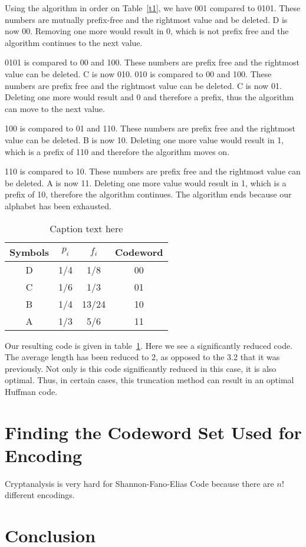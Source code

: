 \documentclass[10pt,letterpaper,notitlepage,draft]{article}
\theoremstyle{definition}
\begin{document}
Using the algorithm in order on Table~\ref{t1}, we have 
001 compared to 0101.  
These numbers are mutually prefix-free and the rightmost value and be deleted.  
D is now 00.  
Removing one more would result in 0, which is not prefix free and the algorithm continues to the next value.

0101 is compared to 00 and 100.
These numbers are prefix free and the rightmost value can be deleted.
C is now 010.
010 is compared to 00 and 100.
These numbers are prefix free and the rightmost value can be deleted.
C is now 01.
Deleting one more would result and 0 and therefore a prefix, thus the algorithm can move to the next value.

100 is compared to 01 and 110.
These numbers are prefix free and the rightmost value can be deleted.
B is now 10.
Deleting one more value would result in 1, which is a prefix of 110 and therefore the algorithm moves on.

110 is compared to 10.
These numbers are prefix free and the rightmost value can be deleted.
A is now 11.
Deleting one more value would result in 1, which is a prefix of 10, therefore the algorithm continues.
The algorithm ends because our alphabet has been exhausted.

\begin{table}[h]
\begin{center}
\begin{tabular}{|c|c|c|c|}
\hline
Symbols & $p_i$ & $f_i$ & Codeword \\
\hline
\hline
D & 1/4 & 1/8 & 00 \\
\hline
C & 1/6 & 1/3 & 01 \\
\hline
B & 1/4 & 13/24 & 10 \\
\hline
A & 1/3 & 5/6 & 11 \\
\hline
\end{tabular}
\end{center}
\caption{Caption text here}\label{t3}
\end{table}

Our resulting code is given in table~\ref{t3}.
Here we see a significantly reduced code.  The average length has been reduced to 2, as opposed to the 3.2 that it was previously.  Not only is this code significantly reduced in this case, it is also optimal.  Thus, in certain cases, this truncation method can result in an optimal Huffman code.


\section{Finding the Codeword Set Used for Encoding}
Cryptanalysis is very hard for Shannon-Fano-Elias Code because there are $n!$ different encodings.



\section{Conclusion}

%
%
\end{document}
